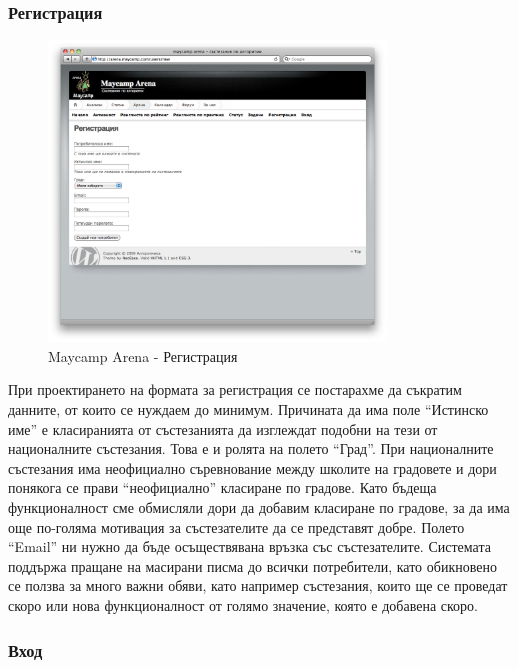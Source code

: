 \documentclass[a4paper,12pt]{article}
\begin{document}
  \subsubsection{Регистрация}
  
  \begin{figure}[ht]
    \begin{center}
      \includegraphics[width=0.8\textwidth]{images/maycamp_arena_register.png}
    \end{center}
    \caption{Maycamp Arena - Регистрация}
    \label{arena_register}
  \end{figure}
  
  При проектирането на формата за регистрация се постарахме да съкратим данните, от които се нуждаем до минимум. Причината да има поле ``Истинско име'' е класиранията от състезанията да изглеждат подобни на тези от националните състезания. Това е и ролята на полето ``Град''. При националните състезания има неофициално съревнование между школите на градовете и дори понякога се прави ``неофициално'' класиране по градове. Като бъдеща функционалност сме обмисляли дори да добавим класиране по градове, за да има още по-голяма мотивация за състезателите да се представят добре.
  Полето ``Email'' ни нужно да бъде осъществявана връзка със състезателите. Системата поддържа пращане на масирани писма до всички потребители, като обикновено се ползва за много важни обяви, като например състезания, които ще се проведат скоро или нова функционалност от голямо значение, която е добавена скоро.
    
  \subsubsection{Вход}
\end{document}
